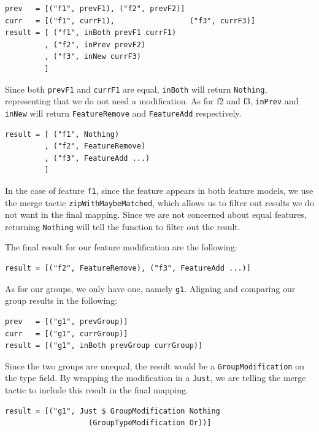 \documentclass[a4paper,english]{ifimaster}
\begin{document}
\begin{verbatim}
prev   = [("f1", prevF1), ("f2", prevF2)]
curr   = [("f1", currF1),                 ("f3", currF3)]
result = [ ("f1", inBoth prevF1 currF1)
         , ("f2", inPrev prevF2)
         , ("f3", inNew currF3)
         ]
\end{verbatim}

Since both \texttt{prevF1} and \texttt{currF1} are equal, \texttt{inBoth} will return \texttt{Nothing}, representing that we do not need a modification. As for f2 and f3, \texttt{inPrev} and \texttt{inNew} will return \texttt{FeatureRemove} and \texttt{FeatureAdd} respectively.

\begin{verbatim}
result = [ ("f1", Nothing)
         , ("f2", FeatureRemove)
         , ("f3", FeatureAdd ...)
         ]
\end{verbatim}

In the case of feature \texttt{f1}, since the feature appears in both feature models, we use the merge tactic \texttt{zip\-With\-Maybe\-Matched}, which allows us to filter out results we do not want in the final mapping. Since we are not concerned about equal features, returning \texttt{Nothing} will tell the function to filter out the result.

The final result for our feature modification are the following:

\begin{verbatim}
result = [("f2", FeatureRemove), ("f3", FeatureAdd ...)]
\end{verbatim}

As for our groups, we only have one, namely \texttt{g1}. Aligning and comparing our group results in the following:

\begin{verbatim}
prev   = [("g1", prevGroup)]
curr   = [("g1", currGroup)]
result = [("g1", inBoth prevGroup currGroup)]
\end{verbatim}

Since the two groups are unequal, the result would be a \texttt{GroupModification} on the type field. By wrapping the modification in a \texttt{Just}, we are telling the merge tactic to include this result in the final mapping.

\begin{verbatim}
result = [("g1", Just $ GroupModification Nothing 
                   (GroupTypeModification Or))]
\end{verbatim}
\end{document}
